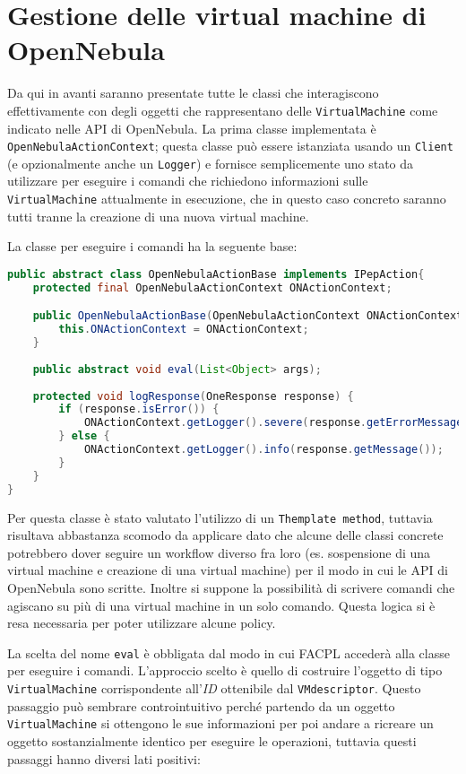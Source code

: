 \section{Gestione delle virtual machine di OpenNebula}
Da qui in avanti saranno presentate tutte le classi che interagiscono effettivamente con degli oggetti che rappresentano delle \texttt{VirtualMachine} come indicato nelle API di OpenNebula.
La prima classe implementata è \texttt{OpenNebulaActionContext}; questa classe può essere istanziata usando un \texttt{Client} (e opzionalmente anche un \texttt{Logger}) e fornisce semplicemente uno stato da utilizzare per eseguire i comandi che richiedono informazioni sulle \texttt{VirtualMachine} attualmente in esecuzione, che in questo caso concreto saranno tutti tranne la creazione di una nuova virtual machine.\par
La classe per eseguire i comandi ha la seguente base:
\begin{lstlisting}[language=Java, caption=Classe astratta per i comandi, label=code:OpenNebulaActionBase]
public abstract class OpenNebulaActionBase implements IPepAction{
    protected final OpenNebulaActionContext ONActionContext;

    public OpenNebulaActionBase(OpenNebulaActionContext ONActionContext) {
        this.ONActionContext = ONActionContext;
    }
    
    public abstract void eval(List<Object> args);
    
    protected void logResponse(OneResponse response) {
        if (response.isError()) {
            ONActionContext.getLogger().severe(response.getErrorMessage());
        } else {
            ONActionContext.getLogger().info(response.getMessage());
        }
    }
}
\end{lstlisting}
Per questa classe è stato valutato l'utilizzo di un \texttt{Themplate method}, tuttavia risultava abbastanza scomodo da applicare dato che alcune delle classi concrete potrebbero dover seguire un workflow diverso fra loro (es. sospensione di una virtual machine e creazione di una virtual machine) per il modo in cui le API di OpenNebula sono scritte. Inoltre si suppone la possibilità di scrivere comandi che agiscano su più di una virtual machine in un solo comando. Questa logica si è resa necessaria per poter utilizzare alcune policy.\par
La scelta del nome \texttt{eval} è obbligata dal modo in cui FACPL accederà alla classe per eseguire i comandi.
L'approccio scelto è quello di costruire l'oggetto di tipo \texttt{VirtualMachine} corrispondente all'\emph{ID} ottenibile dal \texttt{VMdescriptor}. Questo passaggio può sembrare controintuitivo perché partendo da un oggetto \texttt{VirtualMachine} si ottengono le sue informazioni per poi andare a ricreare un oggetto sostanzialmente identico per eseguire le operazioni, tuttavia questi passaggi hanno diversi lati positivi:
